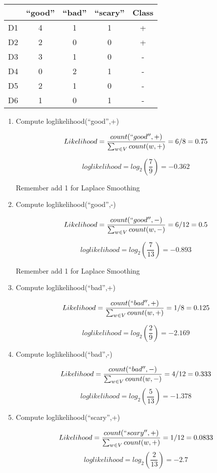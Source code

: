 \documentclass[11pt]{article}
\begin{document}
\begin{enumerate}
\begin{center}
\begin{tabular}{|l|c|c|c||c|} \hline
~ & {\bf ``good''} & {\bf ``bad''} & {\bf ``scary''} & {\bf Class} \\ \hline
D1 & 4 & 1 & 1 & + \\
D2 & 2 & 0 & 0 & + \\ \hline
D3 & 3 & 1 & 0 & - \\
D4 & 0 & 2 & 1 & - \\
D5 & 2 & 1 & 0 & - \\
D6 & 1 & 0 & 1 & - \\ \hline
\end{tabular}
\end{center}

\vspace*{.1in}
\begin{enumerate}
\item Compute loglikelihood(``good'',+)

$$Likelihood = \frac{count(``good'', +)}{\sum_{w \in V} count(w, +)} = 6/8 = 0.75$$ 

$$loglikelihood = log_2 (\frac{7}{9}) = -0.362$$

Remember add 1 for Laplace Smoothing

\item Compute loglikelihood(``good'',-)

$$Likelihood = \frac{count(``good'', -)}{\sum_{w \in V} count(w, -)} = 6/12 = 0.5$$ 

$$loglikelihood = log_2 (\frac{7}{13}) = -0.893$$

Remember add 1 for Laplace Smoothing

\item Compute loglikelihood(``bad'',+)

$$Likelihood = \frac{count(``bad'', +)}{\sum_{w \in V} count(w, +)} = 1/8 = 0.125$$

$$loglikelihood = log_2 (\frac{2}{9}) = -2.169$$

\item Compute loglikelihood(``bad'',-)

$$Likelihood = \frac{count(``bad'', -)}{\sum_{w \in V} count(w, -)} = 4/12 = 0.333$$
$$loglikelihood = log_2 (\frac{5}{13}) = -1.378$$

\item Compute loglikelihood(``scary'',+)

$$Likelihood = \frac{count(``scary'', +)}{\sum_{w \in V} count(w, +)} = 1/12 = 0.0833$$
$$loglikelihood = log_2 (\frac{2}{13}) = -2.7$$


\end{enumerate}
\end{enumerate}
\end{document}

